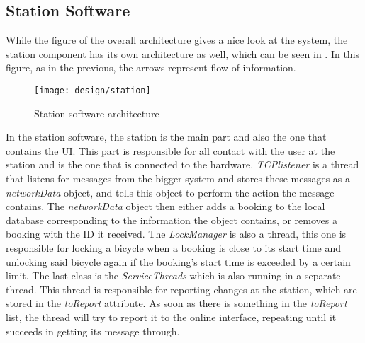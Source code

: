 \subsection{Station Software}
While the figure of the overall architecture gives a nice look at the system, the station component has its own architecture as well, which can be seen in . In this figure, as in the previous, the arrows represent flow of information.

\begin{figure}[h]
	\centering
	\texttt{[image: design/station]}
	\caption{Station software architecture}\label{fig:stationarch}
\end{figure}

In the station software, the station is the main part and also the one that contains the UI. 
This part is responsible for all contact with the user at the station and is the one that is connected to the hardware.
\textit{TCPlistener} is a thread that listens for messages from the bigger system and stores these messages as a \textit{networkData} object, and tells this object to perform the action the message contains.
The \textit{networkData} object then either adds a booking to the local database corresponding to the information the object contains, or removes a booking with the ID it received.
The \textit{LockManager} is also a thread, this one is responsible for locking a bicycle when a booking is close to its start time and unlocking said bicycle again if the booking's start time is exceeded by a certain limit.
The last class is the \textit{ServiceThreads} which is also running in a separate thread.
This thread is responsible for reporting changes at the station, which are stored in the \textit{toReport} attribute.
As soon as there is something in the \textit{toReport} list, the thread will try to report it to the online interface, repeating until it succeeds in getting its message through.